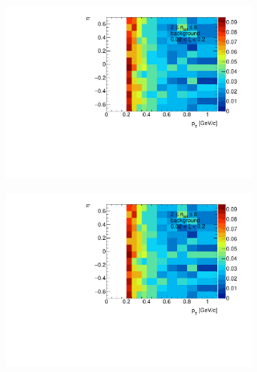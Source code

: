 \begin{figure}[h!]
	\centering
	\begin{subfigure}{.45\textwidth}
		\includegraphics[width=\linewidth, page=1]{chapters/chrgSTAR/img/chargedBkg/bkg2D.pdf}
	\end{subfigure}
	\begin{subfigure}{.45\textwidth}
		\includegraphics[width=\linewidth, page=3]{chapters/chrgSTAR/img/chargedBkg/bkg2D.pdf}
	\end{subfigure}

\end{figure}
